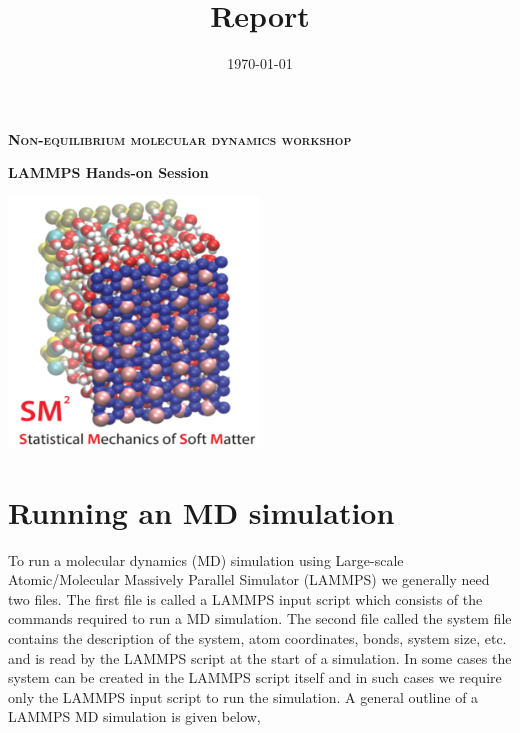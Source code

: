 \documentclass[12pt]{article}
\title{Report}
\author{}
\date{\today}
\begin{document}
\begin{titlepage}
        \centering
        {\scshape\Large\bfseries Non-equilibrium molecular dynamics workshop \par} 
        \vfill
        {\Large\bfseries LAMMPS Hands-on Session \par}
        \vfill
        \includegraphics[width=0.5\textwidth]{sm2_logo.png}\par %
        \vfill

\end{titlepage}

\newpage
\tableofcontents
\newpage

\section{Running an MD simulation}
To run a molecular dynamics (MD) simulation using 
Large-scale Atomic/Molecular Massively Parallel Simulator (LAMMPS) we generally need two files.
The first file is called a LAMMPS input script which consists of the commands required to run
a MD simulation.
The second file called the system file contains the description of the system, atom coordinates, bonds, system size, etc. and is read by the LAMMPS script at the start of a simulation.
In some cases the system can be created in the LAMMPS script itself and in such cases we 
require only the LAMMPS input script to run the simulation.
A general outline of a LAMMPS MD simulation is given below,
\end{document}
